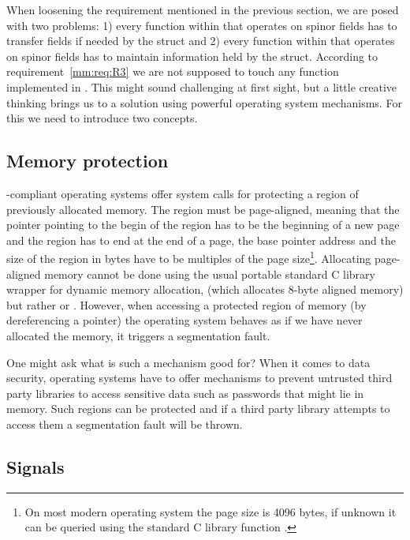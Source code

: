 When loosening the requirement mentioned in the previous section, we are posed with two problems:
1) every function within \openqxd that operates on spinor fields has to transfer fields if needed by the  struct and
2) every function within \openqxd that operates on spinor fields has to maintain information held by the  struct.
According to requirement~\ref{mm:req:R3} we are not supposed to touch any function implemented in \openqxd.
This might sound challenging at first sight, but a little creative thinking brings us to a solution using powerful operating system mechanisms.
For this we need to introduce two concepts.

\subsection{Memory protection}
\label{sec:mm:mprotect}

\Posix-compliant operating systems offer system calls for protecting a region of previously allocated memory.
The region must be page-aligned, meaning that the pointer pointing to the begin of the region has to be the beginning of a new page and the region has to end at the end of a page, \ie the base pointer address and the size of the region in bytes have to be multiples of the page size\footnote{On most modern operating system the page size is \num{4096} bytes, if unknown it can be queried using the standard C library function .}.
Allocating page-aligned memory cannot be done using the usual portable standard C library wrapper for dynamic memory allocation,  (which allocates 8-byte aligned memory) but rather  or .
However, when accessing a protected region of memory (by dereferencing a pointer) the operating system behaves as if we have never allocated the memory, \ie it triggers a segmentation fault.

One might ask what is such a mechanism good for?
When it comes to data security, operating systems have to offer mechanisms to prevent untrusted third party libraries to access sensitive data such as passwords that might lie in memory.
Such regions can be protected and if a third party library attempts to access them a segmentation fault will be thrown.

\subsection{Signals}
\label{sec:mm:signals}

